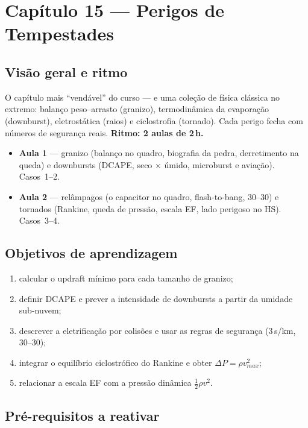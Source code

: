 \section{Capítulo 15 --- Perigos de Tempestades}

\subsection*{Visão geral e ritmo}

O capítulo mais ``vendável'' do curso — e uma coleção de física
clássica no extremo: balanço peso--arrasto (granizo), termodinâmica da
evaporação (downburst), eletrostática (raios) e ciclostrofia
(tornado). Cada perigo fecha com números de segurança reais.
\textbf{Ritmo: 2 aulas de 2\,h.}

\begin{itemize}
  \item \textbf{Aula 1} — granizo (balanço no quadro, biografia da
        pedra, derretimento na queda) e downbursts (DCAPE, seco ×
        úmido, microburst e aviação). Casos~1--2.
  \item \textbf{Aula 2} — relâmpagos (o capacitor no quadro,
        flash-to-bang, 30--30) e tornados (Rankine, queda de pressão,
        escala EF, lado perigoso no HS). Casos~3--4.
\end{itemize}

\subsection*{Objetivos de aprendizagem}

\begin{enumerate}
  \item calcular o updraft mínimo para cada tamanho de granizo;
  \item definir DCAPE e prever a intensidade de downbursts a partir da
        umidade sub-nuvem;
  \item descrever a eletrificação por colisões e usar as regras de
        segurança (3\,s/km, 30--30);
  \item integrar o equilíbrio ciclostrófico do Rankine e obter
        $\Delta P = \rho v_{max}^2$;
  \item relacionar a escala EF com a pressão dinâmica
        $\tfrac12\rho v^2$.
\end{enumerate}

\subsection*{Pré-requisitos a reativar}

